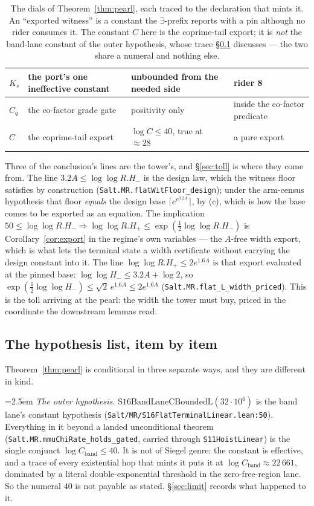 \documentclass[11pt]{amsart}
\newcommand{\leaninline}[1]{{\small\texttt{#1}}}
\theoremstyle{remark}
\begin{document}
\begin{table}[h]
\begin{tabular}{llll}
$K_s$ & the port's one ineffective constant & unbounded from the needed side & rider 8 \\
\midrule
$C_q$ & the co-factor grade gate & positivity only & inside the co-factor predicate \\
$C$ & the coprime-tail export & $\log C\le 40$, true at ${\approx}28$ & a pure export \\
\bottomrule
\end{tabular}
\caption{The dials of Theorem~\ref{thm:pearl}, each traced to the
declaration that mints it. An ``exported witness'' is a constant the
$\exists$-prefix reports with a pin although no rider consumes it. The
constant $C$ here is the coprime-tail export; it is \emph{not} the
band-lane constant of the outer hypothesis, whose trace
\S\ref{sec:pearl-hyp} discusses --- the two share a numeral and nothing
else.}
\label{tab:dials}
\end{table}

Three of the conclusion's lines are the tower's, and \S\ref{sec:toll} is where
they come from. The line $3.2A \le \log\log R.H_-$ is the design law, which the
witness floor satisfies by construction
(\leaninline{Salt.MR.flatWitFloor\_design}); under the arm-census hypothesis
that floor \emph{equals} the design base $\lceil e^{e^{3.2A}}\rceil$, by (c),
which is how the base comes to be exported as an equation. The implication
$50 \le \log\log R.H_- \Rightarrow \log\log R.H_+ \le
\exp(\tfrac12\log\log R.H_-)$ is Corollary~\ref{cor:export} in the regime's own
variables --- the $A$-free width export, which is what lets the terminal state
a width certificate without carrying the design constant into it. The line
$\log\log R.H_+ \le 2e^{1.6A}$ is that export evaluated at the pinned base:
$\log\log H_- \le 3.2A + \log 2$, so
$\exp(\tfrac12\log\log H_-) \le \sqrt{2}\,e^{1.6A} \le 2e^{1.6A}$
(\leaninline{Salt.MR.flat\_L\_width\_priced}). This is the toll arriving at the
pearl: the width the tower must buy, priced in the coordinate the downstream
lemmas read.

\subsection{The hypothesis list, item by item}\label{sec:pearl-hyp}
Theorem~\ref{thm:pearl} is conditional in three separate ways, and they are
different in kind.

{\emergencystretch=2.5em
\emph{The outer hypothesis.} $\mathrm{S16BandLaneCBoundedL}(32\cdot10^{6})$
is the band lane's constant hypothesis
(\leaninline{Salt/\allowbreak MR/\allowbreak S16FlatTerminalLinear.lean:50}). Everything in it beyond a landed unconditional theorem
(\leaninline{Salt.MR.\allowbreak mmuChiRate\_holds\_gated}, carried through
\leaninline{S11HoistLinear}) is the single conjunct $\log C_{\mathrm{band}}
\le 40$. It is not of Siegel genre: the constant is effective, and a trace of
every existential hop that mints it puts it at
$\log C_{\mathrm{band}} \approx 22\,661$, dominated by a literal
double-exponential threshold in the zero-free-region lane. So the numeral $40$
is not payable as stated. \S\ref{sec:limit} records what happened to it.\par}
\end{document}
